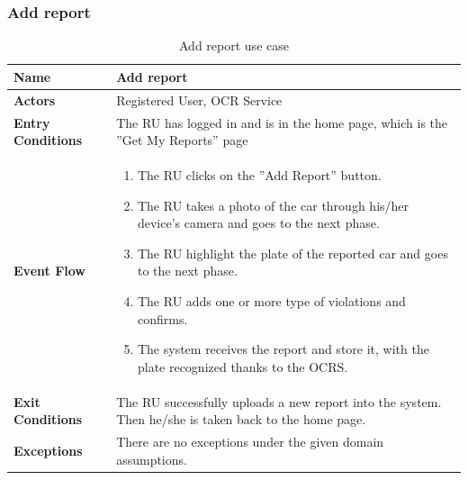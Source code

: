 					\subsubsection{Add report}
					\begin{table}[!h]
						\centering
						\vspace{-4mm}
						\begin{tabular}{lp{}}
							\toprule
							\textbf{Name} & \textbf{Add report} \\[1mm]
							\midrule
							\textbf{Actors} & Registered User, OCR Service \\[1mm]
							\textbf{Entry Conditions} & The RU has logged in and is in the home page, which is the ''Get My Reports'' page \vspace{1mm}\\
							\textbf{Event Flow} &
							\vspace{-5mm} 
							\begin{enumerate}
								\setlength\itemsep{0.2mm}
								\item The RU clicks on the ''Add Report'' button.
								\item The RU takes a photo of the car through his/her device's camera and goes to the next phase.
								\item The RU highlight the plate of the reported car and goes to the next phase.
								\item The RU adds one or more type of violations and confirms.
								\item The system receives the report and store it, with the plate recognized thanks to the OCRS.	
							\end{enumerate} \\
							\textbf{Exit Conditions} & The RU successfully uploads a new report into the system. Then he/she is taken back to the home page. \vspace{1mm}\\
							\textbf{Exceptions} & There are no exceptions under the given domain assumptions. \\[1mm]
							\bottomrule
						\end{tabular}
						\caption{Add report use case}
					\end{table}
					\clearpage
